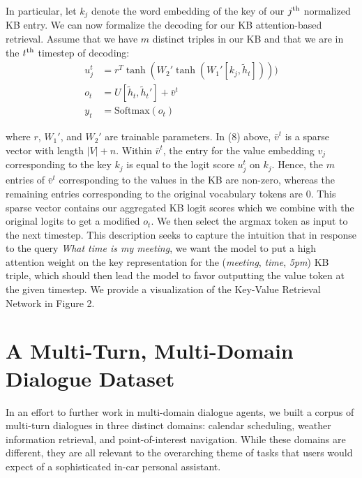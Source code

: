 \documentclass[11pt,a4paper]{article}
\newcommand{\whethermath}[1]{\ifmmode{#1}\else{$#1$}\fi}
\newcommand{\uprm}[1]{\whethermath{^{\mbox{\scriptsize #1}}}}
\begin{document}
  In particular, let $k_j$ denote the word embedding of the key of our $j\uprm{th}$ normalized KB entry. We can now formalize the decoding for our KB attention-based retrieval. Assume that we have $m$ distinct triples in our KB and that we are in the $t\uprm{th}$ timestep of decoding: 
    \begin{align}
          u_j^t &= r^T \tanh(W_2'\tanh(W_1'[k_j, \tilde h_t]))) \\
          o_t &= U[\tilde h_t, \tilde h_t'] + \bar v^t \\
          y_t &= \textrm{Softmax}(o_t)
    \end{align}

    \noindent where $r$, $W_1'$, and $W_2'$ are trainable parameters. In (8) above, $\bar v^t$ is a sparse vector with length $|V| + n$. Within $\bar v^t$, the entry for the value embedding $v_j$ corresponding to the key $k_j$ is equal to the logit score $u_j^t$ on $k_j$. Hence, the $m$ entries of $\bar v^t$ corresponding to the values in the KB are non-zero, whereas the remaining entries corresponding to the original vocabulary tokens are $0$. This sparse vector contains our aggregated KB logit scores which we combine with the original logits to get a modified $o_t$. We then select the argmax token as input to the next timestep. This description seeks to capture the intuition that in response to the query \emph{What time is my meeting}, we want the model to put a high attention weight on the key representation for the (\emph{meeting}, \emph{time}, \emph{5pm}) KB triple, which should then lead the model to favor outputting the value token at the given timestep. We provide a visualization of the Key-Value Retrieval Network in Figure 2. 



\section{A Multi-Turn, Multi-Domain Dialogue Dataset}
    In an effort to further work in multi-domain dialogue agents, we built a corpus of multi-turn dialogues in three distinct domains: calendar scheduling, weather information retrieval, and point-of-interest navigation. While these domains are different, they are all relevant to the overarching theme of tasks that users would expect of a sophisticated in-car personal assistant.\\
\end{document}
